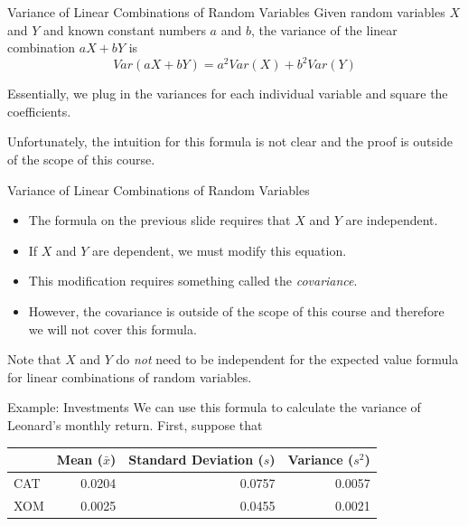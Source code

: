 \begin{frame}{Variance of Linear Combinations of Random Variables}
    Given random variables $X$ and $Y$ and known constant numbers $a$ and $b$, the variance of the linear combination $aX+bY$ is
    \[
        Var(aX+bY)=a^2 Var(X) + b^2 Var(Y)
    \]
    
    Essentially, we plug in the variances for each individual variable and square the coefficients. 

    \vspace{12pt}Unfortunately, the intuition for this formula is not clear and the proof is outside of the scope of this course.
\end{frame}

\begin{frame}{Variance of Linear Combinations of Random Variables}
    \begin{itemize}
        \item The formula on the previous slide requires that $X$ and $Y$ are independent.
        \item If $X$ and $Y$ are dependent, we must modify this equation.
        \item This modification requires something called the \textit{covariance}.
        \item However, the covariance is outside of the scope of this course and therefore we will not cover this formula. 
    \end{itemize}
    
    \vspace{12pt}Note that $X$ and $Y$ do \textit{not} need to be independent for the expected value formula for linear combinations of random variables.
\end{frame}

\begin{frame}{Example: Investments}
    We can use this formula to calculate the variance of Leonard's monthly return. First, suppose that
    \begin{center}
        \begin{tabular}{l rrr}
            \hline
            & Mean ($\bar{x}$) & Standard Deviation ($s$) & Variance ($s^2$)\\
            \hline
            CAT & 0.0204 & 0.0757 & 0.0057 \\
            XOM & 0.0025 & 0.0455 & 0.0021 \\
            \hline
        \end{tabular}
    \end{center}
\end{frame}

